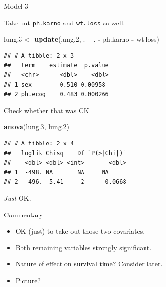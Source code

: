 \documentclass[
  ignorenonframetext,
]{beamer}
\newenvironment{Shaded}{\begin{snugshade}}{\end{snugshade}}
\newcommand{\FloatTok}[1]{\textcolor[rgb]{0.00,0.00,0.81}{#1}}
\newcommand{\KeywordTok}[1]{\textcolor[rgb]{0.13,0.29,0.53}{\textbf{#1}}}
\newcommand{\NormalTok}[1]{#1}
\newcommand{\OperatorTok}[1]{\textcolor[rgb]{0.81,0.36,0.00}{\textbf{#1}}}
\newcommand{\StringTok}[1]{\textcolor[rgb]{0.31,0.60,0.02}{#1}}
\begin{document}
\begin{frame}[fragile]{Model 3}
\protect\hypertarget{model-3}{}

Take out \texttt{ph.karno} and \texttt{wt.loss} as well.

\begin{Shaded}
\begin{Highlighting}[]
\NormalTok{lung}\FloatTok{.3}\NormalTok{ <-}\StringTok{ }\KeywordTok{update}\NormalTok{(lung}\FloatTok{.2}\NormalTok{, . }\OperatorTok{~}\StringTok{ }\NormalTok{. }\OperatorTok{-}\StringTok{ }\NormalTok{ph.karno }\OperatorTok{-}\StringTok{ }\NormalTok{wt.loss)}
\end{Highlighting}
\end{Shaded}

\begin{Shaded}
\end{Shaded}

\begin{verbatim}
## # A tibble: 2 x 3
##   term    estimate  p.value
##   <chr>      <dbl>    <dbl>
## 1 sex       -0.510 0.00958 
## 2 ph.ecog    0.483 0.000266
\end{verbatim}

\end{frame}

\begin{frame}[fragile]{Check whether that was OK}
\protect\hypertarget{check-whether-that-was-ok}{}

\begin{Shaded}
\begin{Highlighting}[]
\KeywordTok{anova}\NormalTok{(lung}\FloatTok{.3}\NormalTok{, lung}\FloatTok{.2}\NormalTok{)}
\end{Highlighting}
\end{Shaded}

\begin{verbatim}
## # A tibble: 2 x 4
##   loglik Chisq    Df `P(>|Chi|)`
##    <dbl> <dbl> <int>       <dbl>
## 1  -498. NA       NA     NA     
## 2  -496.  5.41     2      0.0668
\end{verbatim}

\emph{Just} OK.

\end{frame}

\begin{frame}{Commentary}
\protect\hypertarget{commentary}{}

\begin{itemize}
\item
  OK (just) to take out those two covariates.
\item
  Both remaining variables strongly significant.
\item
  Nature of effect on survival time? Consider later.
\item
  Picture?
\end{itemize}

\end{frame}
\end{document}
